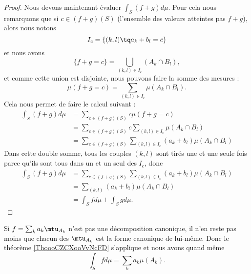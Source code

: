 \begin{proof}
    Nous devons maintenant évaluer \( \int_S(f+g)d\mu\). Pour cela nous remarquons que si \( c\in (f+g)(S)\) (l'ensemble des valeurs atteintes pas \( f+g\)), alors nous notons
    \begin{equation}
        I_c=\{ (k,l)\tq a_k+b_l=c \}
    \end{equation}
    et nous avons
    \begin{equation}
        \{ f+g=c \}=\bigcup_{(k,l)\in I_c}(A_k\cap B_l),
    \end{equation}
    et comme cette union est disjointe, nous pouvons faire la somme des mesures :
    \begin{equation}
        \mu(f+g=c)=\sum_{(k,l)\in I_c}\mu(A_k\cap B_l).
    \end{equation}
    Cela nous permet de faire le calcul suivant :
    \begin{subequations}
        \begin{align}
            \int_S(f+g)d\mu&=\sum_{c\in (f+g)(S)}c\mu(f+g=c)\\
            &=\sum_{c\in(f+g)(S)}c\sum_{(k,l)\in I_c}\mu(A_k\cap B_l)\\
            &=\sum_{c\in(f+g)(S)}\sum_{(k,l)\in I_c} (a_k+b_l) \mu(A_k\cap B_l)
        \end{align}
    \end{subequations}
    Dans cette double somme, tous les couples \( (k,l)\) sont tirés une et une seule fois parce qu'ils sont tous dans un et un seul des \( I_c\), donc
    \begin{subequations}
        \begin{align}
            \int_S(f+g)d\mu&= \sum_{c\in(f+g)(S)}\sum_{(k,l)\in I_c} (a_k+b_l) \mu(A_k\cap B_l)\\
            &=\sum_{(k,l)}(a_k+b_l)\mu(A_k\cap B_l)\\
            &=\int_Sfd\mu+\int_Sgd\mu.
        \end{align}
    \end{subequations}
\end{proof}

\begin{remark}
    Si \( f=\sum_ka_k\mtu_{A_k}\) n'est pas une décomposition canonique, il n'en reste pas moins que chacun des \( \mtu_{A_k}\) est la forme canonique de lui-même. Donc le théorème \ref{ThoooCZCXooVvNcFD} s'applique et nous avons quand même
    \begin{equation}
        \int_Sfd\mu=\sum_ka_k\mu(A_k).
    \end{equation}
\end{remark}

